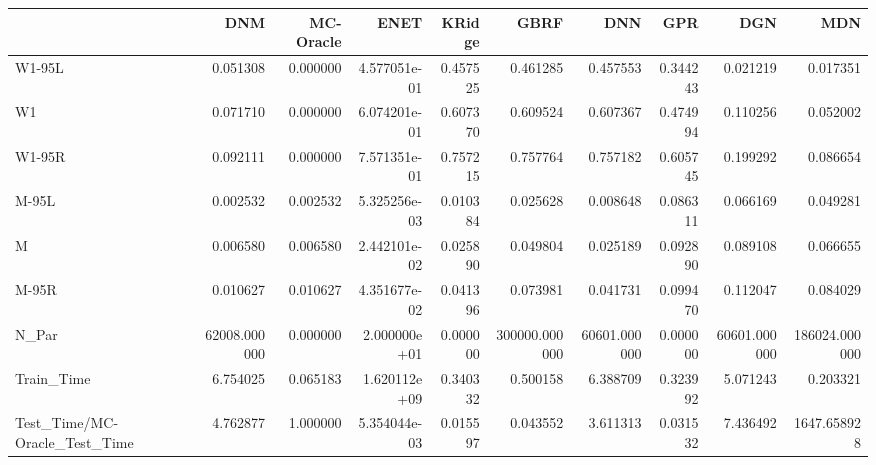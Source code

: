 \begin{tabular}{lrrrrrrrrr}
\toprule
{} &           DNM &  MC-Oracle &          ENET &    KRidge &           GBRF &           DNN &       GPR &           DGN &            MDN \\
\midrule
W1-95L                        &      0.051308 &   0.000000 &  4.577051e-01 &  0.457525 &       0.461285 &      0.457553 &  0.344243 &      0.021219 &       0.017351 \\
W1                            &      0.071710 &   0.000000 &  6.074201e-01 &  0.607370 &       0.609524 &      0.607367 &  0.474994 &      0.110256 &       0.052002 \\
W1-95R                        &      0.092111 &   0.000000 &  7.571351e-01 &  0.757215 &       0.757764 &      0.757182 &  0.605745 &      0.199292 &       0.086654 \\
M-95L                         &      0.002532 &   0.002532 &  5.325256e-03 &  0.010384 &       0.025628 &      0.008648 &  0.086311 &      0.066169 &       0.049281 \\
M                             &      0.006580 &   0.006580 &  2.442101e-02 &  0.025890 &       0.049804 &      0.025189 &  0.092890 &      0.089108 &       0.066655 \\
M-95R                         &      0.010627 &   0.010627 &  4.351677e-02 &  0.041396 &       0.073981 &      0.041731 &  0.099470 &      0.112047 &       0.084029 \\
N\_Par                         &  62008.000000 &   0.000000 &  2.000000e+01 &  0.000000 &  300000.000000 &  60601.000000 &  0.000000 &  60601.000000 &  186024.000000 \\
Train\_Time                    &      6.754025 &   0.065183 &  1.620112e+09 &  0.340332 &       0.500158 &      6.388709 &  0.323992 &      5.071243 &       0.203321 \\
Test\_Time/MC-Oracle\_Test\_Time &      4.762877 &   1.000000 &  5.354044e-03 &  0.015597 &       0.043552 &      3.611313 &  0.031532 &      7.436492 &    1647.658928 \\
\bottomrule
\end{tabular}
